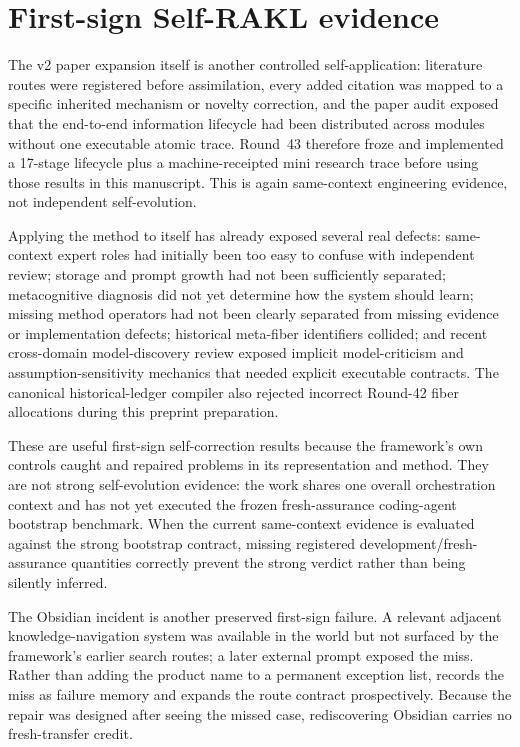 \section{First-sign Self-RAKL evidence}
The v2 paper expansion itself is another controlled self-application: literature routes were registered before assimilation, every added citation was mapped to a specific inherited mechanism or novelty correction, and the paper audit exposed that the end-to-end information lifecycle had been distributed across modules without one executable atomic trace. Round~43 therefore froze and implemented a 17-stage lifecycle plus a machine-receipted mini research trace before using those results in this manuscript. This is again same-context engineering evidence, not independent self-evolution.

Applying the method to itself has already exposed several real defects: same-context expert roles had initially been too easy to confuse with independent review; storage and prompt growth had not been sufficiently separated; metacognitive diagnosis did not yet determine how the system should learn; missing method operators had not been clearly separated from missing evidence or implementation defects; historical meta-fiber identifiers collided; and recent cross-domain model-discovery review exposed implicit model-criticism and assumption-sensitivity mechanics that needed explicit executable contracts. The canonical historical-ledger compiler also rejected incorrect Round-42 fiber allocations during this preprint preparation.

These are useful first-sign self-correction results because the framework's own controls caught and repaired problems in its representation and method. They are not strong self-evolution evidence: the work shares one overall orchestration context and has not yet executed the frozen fresh-assurance coding-agent bootstrap benchmark. When the current same-context evidence is evaluated against the strong bootstrap contract, missing registered development/fresh-assurance quantities correctly prevent the strong verdict rather than being silently inferred.


The Obsidian incident is another preserved first-sign failure. A relevant adjacent knowledge-navigation system was available in the world but not surfaced by the framework's earlier search routes; a later external prompt exposed the miss. Rather than adding the product name to a permanent exception list, \RAKL{} records the miss as failure memory and expands the route contract prospectively. Because the repair was designed after seeing the missed case, rediscovering Obsidian carries no fresh-transfer credit.

